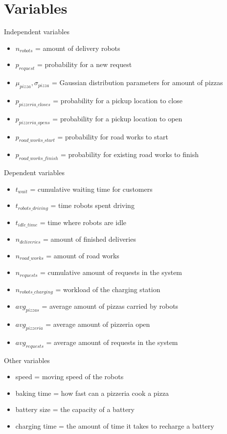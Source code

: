\section{Variables}
\begin{frame}{Independent variables}
    \begin{itemize}
        \item $n_{robots}$ = amount of delivery robots
        \item $p_{request}$ = probability for a new request
        \item $\mu_{pizza}, \sigma_{pizza}$ = Gaussian distribution parameters for amount of pizzas
        \item $p_{pizzeria\_closes}$ = probability for a pickup location to close
        \item $p_{pizzeria\_opens}$  = probability for a pickup location to open
        \item $p_{road\_works\_start}$ = probability for road works to start
        \item $p_{road\_works\_finish}$ = probability for existing road works to finish
    \end{itemize}
\end{frame}

\begin{frame}{Dependent variables}
    \begin{itemize}
        \item $t_{wait}$ = cumulative waiting time for customers
        \item $t_{robots\_driving}$ = time robots spent driving
        \item $t_{idle\_time}$ = time where robots are idle
        \item $n_{deliveries}$ = amount of finished deliveries
        \item $n_{road\_works}$ = amount of road works
        \item $n_{requests}$ = cumulative amount of requests in the system
        \item $n_{robots\_charging}$ = workload of the charging station
        \item $avg_{pizzas}$ = average amount of pizzas carried by robots
        \item $avg_{pizzeria}$ = average amount of pizzeria open
        \item $avg_{requests}$ = average amount of requests in the system
    \end{itemize}
\end{frame}

\begin{frame}{Other variables}
    \begin{itemize}
        \item speed = moving speed of the robots
        \item baking time = how fast can a pizzeria cook a pizza
        \item battery size = the capacity of a battery 
        \item charging time = the amount of time it takes to recharge a battery
    \end{itemize}
\end{frame}
